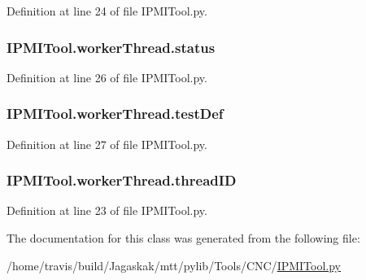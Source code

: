 Definition at line 24 of file I\-P\-M\-I\-Tool.\-py.

\hypertarget{classIPMITool_1_1workerThread_a611bfcde0fa8d328904fde134bde0d87}{
\subsubsection[{status}]{\setlength{\rightskip}{0pt plus 5cm}I\-P\-M\-I\-Tool.\-worker\-Thread.\-status}}\label{classIPMITool_1_1workerThread_a611bfcde0fa8d328904fde134bde0d87}


Definition at line 26 of file I\-P\-M\-I\-Tool.\-py.

\hypertarget{classIPMITool_1_1workerThread_a83638bfbceb196edbfd06990e230cd8e}{
\subsubsection[{test\-Def}]{\setlength{\rightskip}{0pt plus 5cm}I\-P\-M\-I\-Tool.\-worker\-Thread.\-test\-Def}}\label{classIPMITool_1_1workerThread_a83638bfbceb196edbfd06990e230cd8e}


Definition at line 27 of file I\-P\-M\-I\-Tool.\-py.

\hypertarget{classIPMITool_1_1workerThread_ad9622aa9a06ed124fa430c7f57335335}{
\subsubsection[{thread\-I\-D}]{\setlength{\rightskip}{0pt plus 5cm}I\-P\-M\-I\-Tool.\-worker\-Thread.\-thread\-I\-D}}\label{classIPMITool_1_1workerThread_ad9622aa9a06ed124fa430c7f57335335}


Definition at line 23 of file I\-P\-M\-I\-Tool.\-py.



The documentation for this class was generated from the following file\-:\begin{DoxyCompactItemize}
\item 
/home/travis/build/\-Jagaskak/mtt/pylib/\-Tools/\-C\-N\-C/\hyperlink{IPMITool_8py}{I\-P\-M\-I\-Tool.\-py}\end{DoxyCompactItemize}
